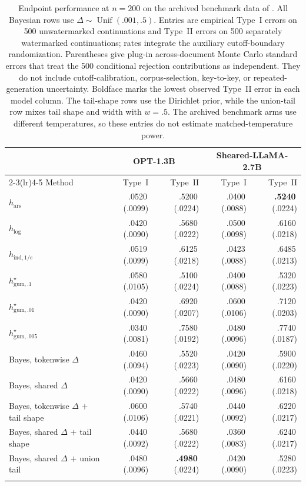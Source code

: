 \documentclass[11pt]{article}
\newcommand{\Unif}{\operatorname{Unif}}
\newcommand{\mcse}[2]{\mbox{#1\,{\fontsize{7}{8}\selectfont(#2)}}}
\newcommand{\bestmcse}[2]{\mbox{\textbf{#1}\,{\fontsize{7}{8}\selectfont(#2)}}}
\begin{document}
\begin{table}[htbp]
\centering
\scriptsize
\setlength{\tabcolsep}{3pt}
\caption{Endpoint performance at $n=200$ on the archived benchmark data of \citet{li2025framework}.  All Bayesian rows use $\Delta\sim\Unif(.001,.5)$.  Entries are empirical Type~I errors on 500 unwatermarked continuations and Type~II errors on 500 separately watermarked continuations; rates integrate the auxiliary cutoff-boundary randomization.  Parentheses give plug-in across-document Monte Carlo standard errors that treat the 500 conditional rejection contributions as independent.  They do not include cutoff-calibration, corpus-selection, key-to-key, or repeated-generation uncertainty.  Boldface marks the lowest observed Type~II error in each model column.  The tail-shape rows use the Dirichlet prior, while the union-tail row mixes tail shape and width with $w=.5$.  The archived benchmark arms use different temperatures, so these entries do not estimate matched-temperature power.}
\label{tab:released-output}
\begin{tabular}{@{}lrrrr@{}}
\toprule
& \multicolumn{2}{c}{OPT-1.3B} & \multicolumn{2}{c}{Sheared-LLaMA-2.7B} \\
\cmidrule(lr){2-3}\cmidrule(lr){4-5}
Method & Type~I & Type~II & Type~I & Type~II \\
\midrule
$h_{\mathrm{ars}}$ & \mcse{.0520}{.0099} & \mcse{.5200}{.0224} & \mcse{.0400}{.0088} & \bestmcse{.5240}{.0224} \\
$h_{\log}$ & \mcse{.0420}{.0090} & \mcse{.5680}{.0222} & \mcse{.0500}{.0098} & \mcse{.6160}{.0218} \\
$h_{\mathrm{ind},1/e}$ & \mcse{.0519}{.0099} & \mcse{.6125}{.0218} & \mcse{.0423}{.0088} & \mcse{.6485}{.0213} \\
$h^\star_{\mathrm{gum},.1}$ & \mcse{.0580}{.0105} & \mcse{.5100}{.0224} & \mcse{.0400}{.0088} & \mcse{.5320}{.0223} \\
$h^\star_{\mathrm{gum},.01}$ & \mcse{.0420}{.0090} & \mcse{.6920}{.0207} & \mcse{.0600}{.0106} & \mcse{.7120}{.0203} \\
$h^\star_{\mathrm{gum},.005}$ & \mcse{.0340}{.0081} & \mcse{.7580}{.0192} & \mcse{.0480}{.0096} & \mcse{.7740}{.0187} \\
Bayes, tokenwise $\Delta$ & \mcse{.0460}{.0094} & \mcse{.5520}{.0223} & \mcse{.0420}{.0090} & \mcse{.5900}{.0220} \\
Bayes, shared $\Delta$ & \mcse{.0420}{.0090} & \mcse{.5660}{.0222} & \mcse{.0480}{.0096} & \mcse{.6160}{.0218} \\
Bayes, tokenwise $\Delta$ $+$ tail shape & \mcse{.0600}{.0106} & \mcse{.5740}{.0221} & \mcse{.0440}{.0092} & \mcse{.6220}{.0217} \\
Bayes, shared $\Delta$ $+$ tail shape & \mcse{.0440}{.0092} & \mcse{.5680}{.0222} & \mcse{.0360}{.0083} & \mcse{.6240}{.0217} \\
Bayes, shared $\Delta$ $+$ union tail & \mcse{.0480}{.0096} & \bestmcse{.4980}{.0224} & \mcse{.0420}{.0090} & \mcse{.5280}{.0223} \\
\addlinespace
\bottomrule
\end{tabular}
\end{table}
\end{document}
